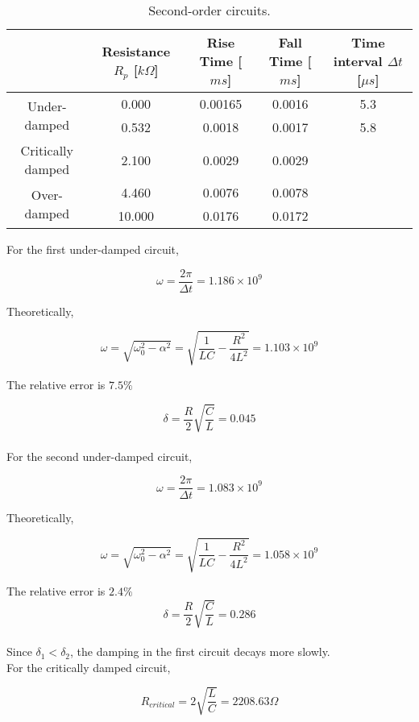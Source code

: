 \documentclass{article}
\begin{document}
\begin{table}[!h]
\begin{center}
\begin{tabular}{|c|c|c|c|c|}
\hline
& Resistance $R_p$ [$k\Omega$] & Rise Time [$ms$] & Fall Time [$ms$] & Time interval $\Delta t$ [$\mu s$] \\
\hline
\multirow{2}{*}{Under-damped}		&	0.000	&	0.00165	&	0.0016	&	5.3	\\
\cline{2-5}
&	0.532	&	0.0018	&	0.0017	&	5.8	\\
\hline
Critically damped	&	2.100	&	0.0029	&	0.0029	&	\multirow{3}{*}{\diagbox[height=3.5em,width=11em,dir=SE]{}{}}\\
\cline{1-4}
\multirow{2}{*}{Over-damped}	&	4.460	&	0.0076	&	0.0078	&	\\
\cline{2-4}
&	10.000	&	0.0176	&	0.0172	&	\\
\hline
\end{tabular}
\caption{Second-order circuits.}
\label{tab-2}
\end{center}
\end{table}

For the first under-damped circuit,

$$\omega=\frac{2\pi}{\Delta t}=1.186\times10^9$$

Theoretically,

$$\omega=\sqrt{\omega_0^2-\alpha^2}=\sqrt{\frac{1}{LC}-\frac{R^2}{4L^2}}=1.103\times10^9$$

The relative error is $7.5\%$

$$\delta=\frac{R}{2}\sqrt{\frac{C}{L}}=0.045$$\\

For the second under-damped circuit,

$$\omega=\frac{2\pi}{\Delta t}=1.083\times10^9$$

Theoretically,

$$\omega=\sqrt{\omega_0^2-\alpha^2}=\sqrt{\frac{1}{LC}-\frac{R^2}{4L^2}}=1.058\times10^9$$

The relative error is $2.4\%$\\

$$\delta=\frac{R}{2}\sqrt{\frac{C}{L}}=0.286$$\\

Since $\delta_1<\delta_2$, the damping in the first circuit decays more slowly.\\

For the critically damped circuit,

$$R_{critical}=2\sqrt{\frac{L}{C}}=2208.63\Omega$$
\end{document}
